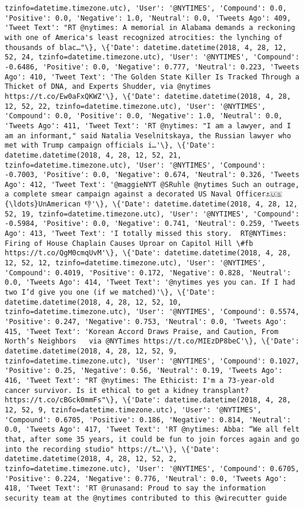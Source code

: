\documentclass[11pt]{article}
\begin{document}
\begin{Verbatim}[commandchars=\\\{\}]
tzinfo=datetime.timezone.utc), 'User': '@NYTIMES', 'Compound': 0.0, 'Positive': 0.0, 'Negative': 1.0, 'Neutral': 0.0, 'Tweets Ago': 409, 'Tweet Text': "RT @nytimes: A memorial in Alabama demands a reckoning with one of America's least recognized atrocities: the lynching of thousands of blac…"\}, \{'Date': datetime.datetime(2018, 4, 28, 12, 52, 24, tzinfo=datetime.timezone.utc), 'User': '@NYTIMES', 'Compound': -0.6486, 'Positive': 0.0, 'Negative': 0.777, 'Neutral': 0.223, 'Tweets Ago': 410, 'Tweet Text': 'The Golden State Killer Is Tracked Through a Thicket of DNA, and Experts Shudder, via @nytimes https://t.co/Ew0aFxQKWZ'\}, \{'Date': datetime.datetime(2018, 4, 28, 12, 52, 22, tzinfo=datetime.timezone.utc), 'User': '@NYTIMES', 'Compound': 0.0, 'Positive': 0.0, 'Negative': 1.0, 'Neutral': 0.0, 'Tweets Ago': 411, 'Tweet Text': 'RT @nytimes: "I am a lawyer, and I am an informant," said Natalia Veselnitskaya, the Russian lawyer who met with Trump campaign officials i…'\}, \{'Date': datetime.datetime(2018, 4, 28, 12, 52, 21, tzinfo=datetime.timezone.utc), 'User': '@NYTIMES', 'Compound': -0.7003, 'Positive': 0.0, 'Negative': 0.674, 'Neutral': 0.326, 'Tweets Ago': 412, 'Tweet Text': '@maggieNYT @SRuhle @nytimes Such an outrage, a complete smear campaign against a decorated US Naval Officer⚓️🇺🇸{\ldots}UnAmerican 👎'\}, \{'Date': datetime.datetime(2018, 4, 28, 12, 52, 19, tzinfo=datetime.timezone.utc), 'User': '@NYTIMES', 'Compound': -0.5984, 'Positive': 0.0, 'Negative': 0.741, 'Neutral': 0.259, 'Tweets Ago': 413, 'Tweet Text': 'I totally missed this story.  RT@NYTimes: Firing of House Chaplain Causes Uproar on Capitol Hill \#fb https://t.co/QgM0cmqUvM'\}, \{'Date': datetime.datetime(2018, 4, 28, 12, 52, 12, tzinfo=datetime.timezone.utc), 'User': '@NYTIMES', 'Compound': 0.4019, 'Positive': 0.172, 'Negative': 0.828, 'Neutral': 0.0, 'Tweets Ago': 414, 'Tweet Text': '@nytimes yes you can. If I had two I’d give you one (if we matched)'\}, \{'Date': datetime.datetime(2018, 4, 28, 12, 52, 10, tzinfo=datetime.timezone.utc), 'User': '@NYTIMES', 'Compound': 0.5574, 'Positive': 0.247, 'Negative': 0.753, 'Neutral': 0.0, 'Tweets Ago': 415, 'Tweet Text': 'Korean Accord Draws Praise, and Caution, From North’s Neighbors   via @NYTimes https://t.co/MIEzDP8beC'\}, \{'Date': datetime.datetime(2018, 4, 28, 12, 52, 9, tzinfo=datetime.timezone.utc), 'User': '@NYTIMES', 'Compound': 0.1027, 'Positive': 0.25, 'Negative': 0.56, 'Neutral': 0.19, 'Tweets Ago': 416, 'Tweet Text': "RT @nytimes: The Ethicist: I'm a 73-year-old cancer survivor. Is it ethical to get a kidney transplant? https://t.co/cBGck0mmFs"\}, \{'Date': datetime.datetime(2018, 4, 28, 12, 52, 9, tzinfo=datetime.timezone.utc), 'User': '@NYTIMES', 'Compound': 0.6705, 'Positive': 0.186, 'Negative': 0.814, 'Neutral': 0.0, 'Tweets Ago': 417, 'Tweet Text': 'RT @nytimes: Abba: “We all felt that, after some 35 years, it could be fun to join forces again and go into the recording studio" https://t…'\}, \{'Date': datetime.datetime(2018, 4, 28, 12, 52, 2, tzinfo=datetime.timezone.utc), 'User': '@NYTIMES', 'Compound': 0.6705, 'Positive': 0.224, 'Negative': 0.776, 'Neutral': 0.0, 'Tweets Ago': 418, 'Tweet Text': 'RT @runasand: Proud to say the information security team at the @nytimes contributed to this @wirecutter guide 
\end{Verbatim}
\end{document}

